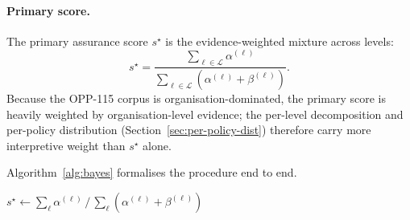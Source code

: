 \documentclass[final,3p,times,twocolumn]{elsarticle}
\begin{document}
	\paragraph{Primary score.}
	The primary assurance score $s^{\star}$ is the evidence-weighted mixture across
	levels:
	\begin{equation}
		s^{\star} = \frac{\sum_{\ell \in \mathcal{L}}\alpha^{(\ell)}}{\sum_{\ell \in
		\mathcal{L}}\left(\alpha^{(\ell)}+ \beta^{(\ell)}\right)}. \label{eq:primary}
	\end{equation}
	Because the OPP-115 corpus is organisation-dominated, the primary score is heavily
	weighted by organisation-level evidence; the per-level decomposition and per-policy
	distribution (Section~\ref{sec:per-policy-dist}) therefore carry more
	interpretive weight than $s^{\star}$ alone.

	Algorithm~\ref{alg:bayes} formalises the procedure end to end.

	\begin{algorithm}
		[h] \SetAlgoLined \DontPrintSemicolon {}
		$s^{\star} \gets \sum_{\ell}\alpha^{(\ell)}\,/\, \sum_{\ell}\!\left(\alpha^{(\ell)}
		+ \beta^{(\ell)}\right)$\; 
		\caption{Beta--Bernoulli assurance aggregation with retained retrieval trace.}
		\label{alg:bayes}
	\end{algorithm}
\end{document}
